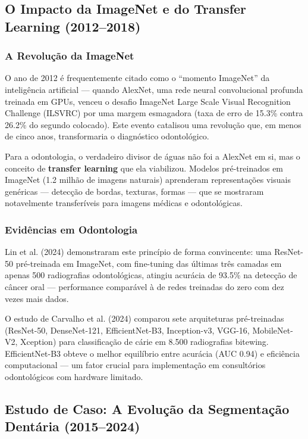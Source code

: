 \subsection{O Impacto da ImageNet e do Transfer Learning (2012--2018)}

\subsubsection{A Revolução da ImageNet}

O ano de 2012 é frequentemente citado como o ``momento ImageNet'' da inteligência artificial — quando AlexNet, uma rede neural convolucional profunda treinada em GPUs, venceu o desafio ImageNet Large Scale Visual Recognition Challenge (ILSVRC) por uma margem esmagadora (taxa de erro de 15.3\% contra 26.2\% do segundo colocado). Este evento catalisou uma revolução que, em menos de cinco anos, transformaria o diagnóstico odontológico.

Para a odontologia, o verdadeiro divisor de águas não foi a AlexNet em si, mas o conceito de \textbf{transfer learning} que ela viabilizou. Modelos pré-treinados em ImageNet (1.2 milhão de imagens naturais) aprenderam representações visuais genéricas — detecção de bordas, texturas, formas — que se mostraram notavelmente transferíveis para imagens médicas e odontológicas.

\subsubsection{Evidências em Odontologia}

Lin et al. (2024) \cite{ODT-026} demonstraram este princípio de forma convincente: uma ResNet-50 pré-treinada em ImageNet, com fine-tuning das últimas três camadas em apenas 500 radiografias odontológicas, atingiu acurácia de 93.5\% na detecção de câncer oral — performance comparável à de redes treinadas do zero com dez vezes mais dados.

O estudo de Carvalho et al. (2024) \cite{ODT-022} comparou sete arquiteturas pré-treinadas (ResNet-50, DenseNet-121, EfficientNet-B3, Inception-v3, VGG-16, MobileNet-V2, Xception) para classificação de cárie em 8.500 radiografias bitewing. EfficientNet-B3 obteve o melhor equilíbrio entre acurácia (AUC 0.94) e eficiência computacional — um fator crucial para implementação em consultórios odontológicos com hardware limitado.

\subsection{Estudo de Caso: A Evolução da Segmentação Dentária (2015--2024)}

